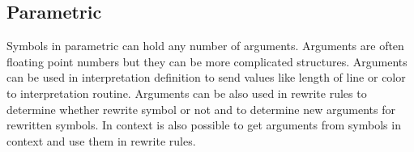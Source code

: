 \subsection{Parametric \lsystems}

Symbols in parametric \lsystems can hold any number of arguments.
Arguments are often floating point numbers but they can be more complicated structures.
Arguments can be used in interpretation definition to send values like length of line or color to interpretation routine.
Arguments can be also used in rewrite rules to determine whether rewrite symbol or not and to determine new arguments for rewritten symbols.
In context \twolsystems is also possible to get arguments from symbols in context and use them in rewrite rules.




































